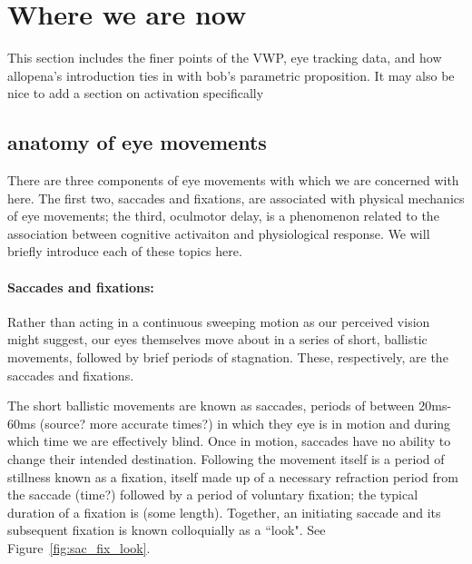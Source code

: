 \documentclass{article}
\begin{document}
\section{Where we are now}

This section includes the finer points of the VWP, eye tracking data, and how allopena's introduction ties in with bob's parametric proposition. It may also be nice to add a section on activation specifically

\subsection{anatomy of eye  movements}

There are three components of eye movements with which we are concerned with here. The first two, saccades and fixations, are associated with physical mechanics of eye movements; the third, oculmotor delay, is a phenomenon related to the association between cognitive activaiton and physiological response. We will briefly introduce each of these topics here. 

\paragraph{Saccades and fixations:} Rather than acting in a continuous sweeping motion as our perceived vision might suggest, our eyes themselves move about in a series of short, ballistic movements, followed by brief periods of stagnation. These, respectively, are the saccades and fixations. 

The short ballistic movements are known as saccades, periods of between 20ms-60ms (source? more accurate times?) in which they eye is in motion and during which time we are effectively blind. Once in motion, saccades have no ability to change their intended destination. Following the movement itself is a period of stillness known as a fixation, itself made up of a necessary refraction period from the saccade (time?) followed by a period of voluntary fixation; the typical duration of a fixation is (some length). Together, an initiating saccade and its subsequent fixation is known colloquially as a ``look". See Figure~\ref{fig:sac_fix_look}.
\end{document}
